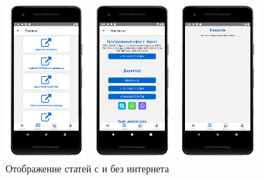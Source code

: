 \begin{figure}[!htb]
\begin{minipage}{0.16\textwidth}
        \includegraphics[height=5.8cm]
        {images/mobile/articles/article_prices.png}
    \end{minipage}
    \begin{minipage}{0.16\textwidth}
        \centering

        \includegraphics[height=5.8cm]
        {images/mobile/articles/article_contacts.png}
    \end{minipage}
    \begin{minipage}{0.16\textwidth}
        \centering

        \includegraphics[height=5.8cm]
        {images/mobile/articles/no-internet.png}
    \end{minipage}
  
    \caption{Отображение статей с и без интернета}
    \label{fig:test_internet_articles}
\end{figure}

